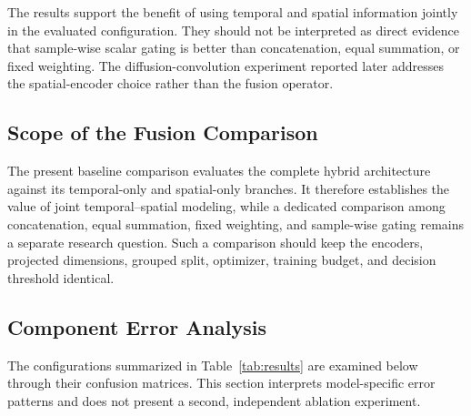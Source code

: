 \documentclass[journal]{IEEEtran}
\begin{document}
\begin{table}[!htbp]
  \centering
  \caption{Summary of test-set performance for STANet and baseline models}
  \label{tab:results}
  \renewcommand{\arraystretch}{1.2}
\end{table}
The results support the benefit of using temporal and spatial information jointly in the evaluated configuration. They should not be interpreted as direct evidence that sample-wise scalar gating is better than concatenation, equal summation, or fixed weighting. The diffusion-convolution experiment reported later addresses the spatial-encoder choice rather than the fusion operator.

\subsection{Scope of the Fusion Comparison}
The present baseline comparison evaluates the complete hybrid architecture against its temporal-only and spatial-only branches. It therefore establishes the value of joint temporal--spatial modeling, while a dedicated comparison among concatenation, equal summation, fixed weighting, and sample-wise gating remains a separate research question. Such a comparison should keep the encoders, projected dimensions, grouped split, optimizer, training budget, and decision threshold identical.

\subsection{Component Error Analysis}
The configurations summarized in Table~\ref{tab:results} are examined below through their confusion matrices. This section interprets model-specific error patterns and does not present a second, independent ablation experiment.
\end{document}
